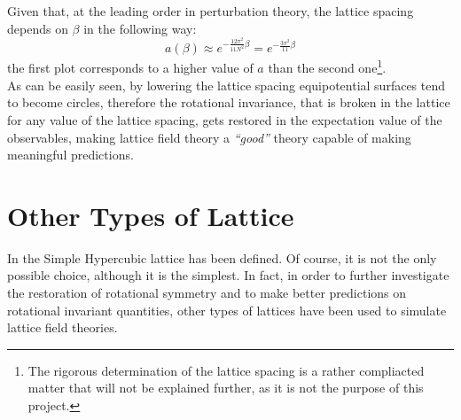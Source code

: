 Given that, at the leading order in perturbation theory, the lattice spacing depends on $\beta$ in the following way:
\begin{equation}
    a(\beta) \approx e^{-\frac{12\pi^2}{11N^2}\beta} = e^{-\frac{3\pi^2}{11}\beta} \label{3:BetaLatticeSpacing} 
\end{equation}
the first plot corresponds to a higher value of $a$ than the second one\footnote{The rigorous determination of the lattice spacing is a rather compliacted matter that will not be explained further, as it is not the purpose of this project.}.\\
As can be easily seen, by lowering the lattice spacing equipotential surfaces tend to become circles, therefore the rotational invariance, that is broken in the lattice for any value of the lattice spacing, gets restored in the expectation value of the observables, making lattice field theory a \emph{``good''} theory capable of making meaningful predictions.

\section{Other Types of Lattice\label{Sec3:Lattices}}
In  the Simple Hypercubic lattice has been defined.
Of course, it is not the only possible choice, although it is the simplest.
In fact, in order to further investigate the restoration of rotational symmetry and to make better predictions on rotational invariant quantities, other types of lattices have been used to simulate lattice field theories.

